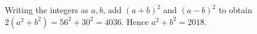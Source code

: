 Writing the integers as $a,b$, add $(a+b)^2$ and $(a-b)^2$ to obtain $2(a^2+b^2)=56^2+30^2=4036$. Hence $\boxed{a^2+b^2=2018}$.
